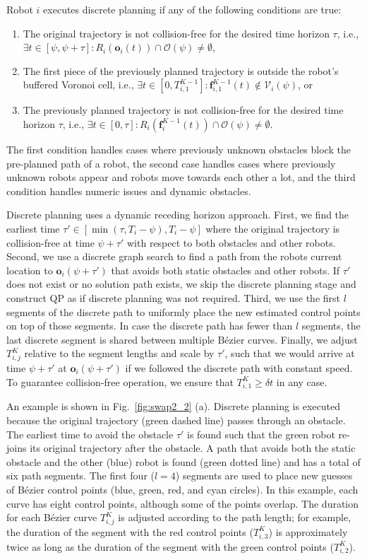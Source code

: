 \documentclass{svproc}
\newcommand{\vf}{\mathbf{f}}
\newcommand{\vo}{\mathbf{o}}
\newcommand{\cV}{\mathcal{V}}
\newcommand{\cO}{\mathcal{O}}
\begin{document}
Robot $i$ executes discrete planning if any of the following conditions are true:
\begin{enumerate}
    \item The original trajectory is not collision-free for the desired time horizon $\tau$, i.e., $\exists t\in [\psi,\psi+\tau] : R_i(\vo_i(t)) \cap \cO(\psi) \neq \emptyset$,
    \item The first piece of the previously planned trajectory is outside the robot's buffered Voronoi cell, i.e., $\exists t\in [0, T^{K-1}_{i,1}] : \vf^{K-1}_{i,1}(t) \not\in \cV_i(\psi)$, or
    \item The previously planned trajectory is not collision-free for the desired time horizon $\tau$, i.e., $\exists t\in [0,\tau] :  R_i(\vf^{K-1}_i(t)) \cap \cO(\psi) \neq \emptyset$.
\end{enumerate}
The first condition handles cases where previously unknown obstacles block the pre-planned path of a robot, the second case handles cases where previously unknown robots appear and robots move towards each other a lot, and the third condition handles numeric issues and dynamic obstacles.

Discrete planning uses a dynamic receding horizon approach. First, we find the earliest time $\tau'\in [\min(\tau, T_i-\psi), T_i-\psi]$ where the original trajectory is collision-free at time $\psi + \tau'$ with respect to both obstacles and other robots.
Second, we use a discrete graph search to find a path from the robots current location to $\vo_i(\psi+\tau')$ that avoids both static obstacles and other robots.
If $\tau'$ does not exist or no solution path exists, we skip the discrete planning stage and construct QP as if discrete planning was not required.
Third, we use the first $l$ segments of the discrete path to uniformly place the new estimated control points on top of those segments.
In case the discrete path has fewer than $l$ segments, the last discrete segment is shared between multiple B\'ezier curves.
Finally, we adjust $T_{i,j}^K$ relative to the segment lengths and scale by $\tau'$, such that we would arrive at time $\psi+\tau'$ at $\vo_i(\psi+\tau')$ if we followed the discrete path with constant speed.
To guarantee collision-free operation, we ensure that $T_{i,1}^K\geq \delta t$ in any case.

An example is shown in Fig.~\ref{fig:swap2_2} (a). 
Discrete planning is executed because the original trajectory (green dashed line) passes through an obstacle.
The earliest time to avoid the obstacle $\tau'$ is found such that the green robot re-joins its original trajectory after the obstacle.
A path that avoids both the static obstacle and the other (blue) robot is found (green dotted line) and has a total of six path segments.
The first four ($l=4$) segments are used to place new guesses of B\'ezier control points (blue, green, red, and cyan circles).
In this example, each curve has eight control points, although some of the points overlap.
The duration for each B\'ezier curve $T^{K}_{i,j}$ is adjusted according to the path length; for example, the duration of the segment with the red control points ($T_{i,3}^K$) is approximately twice as long as the duration of the segment with the green control points ($T_{i,2}^K$).
\end{document}
